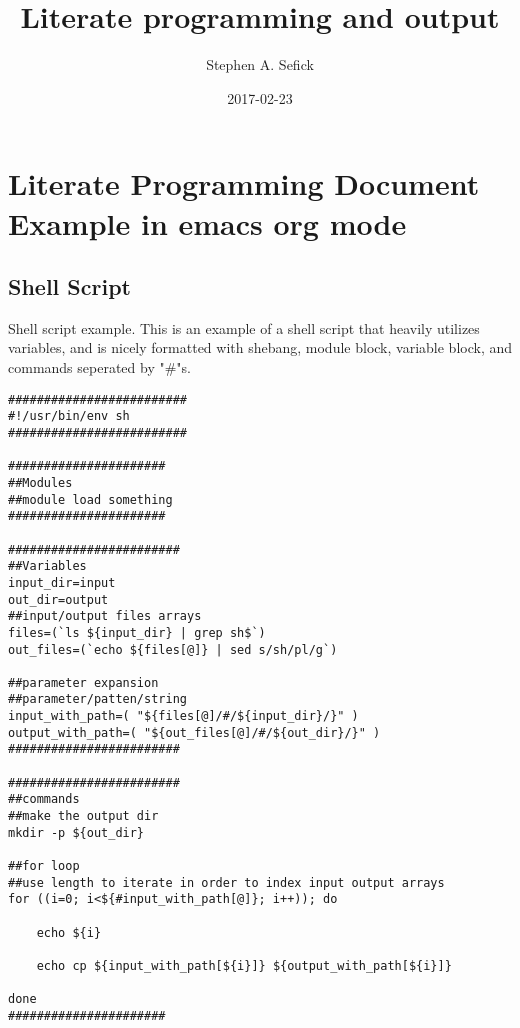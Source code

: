 \documentclass[t,10pt]{article}
\author{Stephen A. Sefick}
\date{2017-02-23}
\title{Literate programming and output}
\begin{document}
\maketitle
\tableofcontents


\section{Literate Programming Document Example in emacs org mode}
\label{sec:orgheadline2}

\subsection{Shell Script}
\label{sec:orgheadline1}

Shell script example. This is an example of a shell script that heavily utilizes variables, and is nicely formatted with shebang, module block, variable block, and commands seperated by "\#"s.

\lstset{language=sh,label= ,caption= ,captionpos=b,numbers=none}
\begin{lstlisting}
#########################
#!/usr/bin/env sh
#########################

######################
##Modules
##module load something
######################

########################
##Variables
input_dir=input
out_dir=output
##input/output files arrays
files=(`ls ${input_dir} | grep sh$`)
out_files=(`echo ${files[@]} | sed s/sh/pl/g`)

##parameter expansion
##parameter/patten/string
input_with_path=( "${files[@]/#/${input_dir}/}" )
output_with_path=( "${out_files[@]/#/${out_dir}/}" )
########################

########################
##commands
##make the output dir
mkdir -p ${out_dir}

##for loop
##use length to iterate in order to index input output arrays
for ((i=0; i<${#input_with_path[@]}; i++)); do

    echo ${i}

    echo cp ${input_with_path[${i}]} ${output_with_path[${i}]} 

done
######################
\end{lstlisting}
\end{document}

